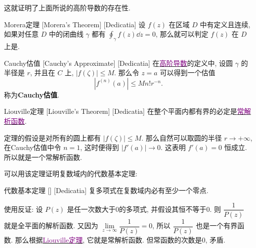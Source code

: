\documentclass[UTF8]{ctexart}
\newcommand{\hyperrefc}[2]{\hyperref[#1]{\textcolor{purple}{#2}}}
\begin{document}
        这就证明了上面所说的高阶导数的存在性. 

        \begin{thm}
            [UUID]
            {Morera定理}
            [Morera's Theorem]
            [Dedicatia]
            设 \(f(z)\) 在区域 \(D\) 中有定义且连续, 如果对任意 \(D\) 中的闭曲线 \(\gamma\) 都有 \(\oint_\gamma f(z)\dd{z}=0\), 那么就可以判定 \(f(z)\) 在 \(D\) 上是.
        \end{thm}

        \begin{dfn}
            [UUID]
            {Cauchy估值}
            [Cauchy's Approximate]
            [Dedicatia]
            在\hyperrefc{dfn:HighOrderedDerivative}{高阶导数}的定义中, 设圆 \(\gamma\) 的半径是 \(r\), 并且在 \(C\) 上,  \(|f(\zeta)|\leqslant M\). 那么令 \(z=a\) 可以得到一个估值
            \[|f^{(n)}(a)|\leqslant Mn!r^{-n}.\]
            称为\textbf{Cauchy估值}.
        \end{dfn}

        \begin{thm}
            [Liouville]
            {Liouville定理}
            [Liouville's Theorem]
            [Dedicatia]
            在整个平面内都有界的 必定是\hyperrefc{ppt:TrivialAnalyticalFunction}{常解析函数}. 
        \end{thm}

        \begin{prf}
            定理的假设是对所有的圆上都有 \(|f(\zeta)|\leqslant M\). 那么自然可以取圆的半径 \(r\to+\infty \), 在Cauchy估值中令 \(n=1\), 这时便得到 \(|f'(a)|\to 0\). 这表明 \(f'(a)=0\) 恒成立. 所以就是一个常解析函数. 
        \end{prf}

        可以用该定理证明复数域内的代数基本定理: 

        \begin{thm}
            [UUID]
            {代数基本定理}
            []
            [Dedicatia]
            复多项式在复数域内必有至少一个零点. 
        \end{thm}

        \begin{prf}
            使用反证: 设 \(P(z)\) 是任一次数大于0的多项式, 并假设其恒不等于0. 则 \(\dfrac{1}{P(z)}\) 就是全平面的解析函数. 又因为 \(\lim\limits_{z\to\infty}\dfrac{1}{P(z)}=0\), 所以 \(\dfrac{1}{P(z)}\) 也是一个有界函数. 那么根据\hyperrefc{thm:Liouville}{Liouville定理}, 它就是常解析函数. 但常函数的次数是0, 矛盾. 
        \end{prf}
\end{document}
